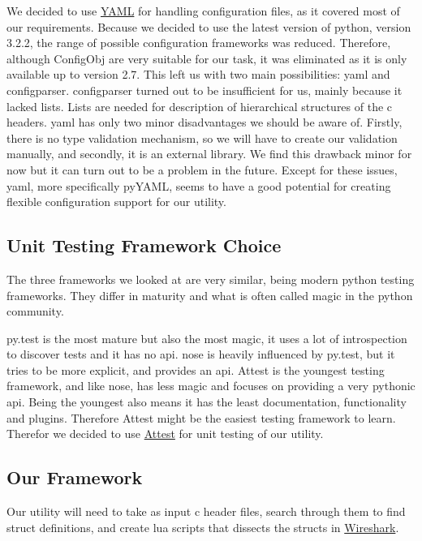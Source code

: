 We decided to use \hyperref[sec:pre:yaml]{YAML} for handling configuration
files, as it covered most of our requirements. Because we decided to use the
latest version of \Gls{python}, version 3.2.2, the range of possible configuration
frameworks was reduced. Therefore, although ConfigObj are very
suitable for our task, it was eliminated as it is only available
up to version 2.7. This left us with two main possibilities: \Gls{yaml} and
configparser. configparser turned out to be insufficient for us, mainly because
it lacked lists. Lists are needed for description of hierarchical structures of
the \Gls{c} \glspl{header}. \Gls{yaml} has only two minor disadvantages we should be aware of.
Firstly, there is no type validation mechanism, so we will have to create our
validation manually, and secondly, it is an external \gls{library}. We find this drawback
minor for now but it can turn out to be a problem in the future. Except for
these issues, \Gls{yaml}, more specifically pyYAML, seems to have a good potential
for creating flexible configuration support for our \gls{utility}.

\subsection{Unit Testing Framework Choice}
\label{sec:pre:testchoice}
The three frameworks we looked at  are very similar, being modern \Gls{python}
testing frameworks. They differ in maturity and what is often called magic in
the \Gls{python} community.

py.test is the most mature but also the most magic, it uses a lot of
introspection to discover tests and it has no \Gls{api}. nose is heavily influenced
by py.test, but it tries to be more explicit, and provides an \Gls{api}. Attest is
the youngest testing framework, and like nose, has less magic and focuses on
providing a very pythonic \Gls{api}. Being the youngest also means it has the least
documentation, functionality and plugins. Therefore Attest might be the easiest
testing framework to learn. Therefor we decided to use
\hyperref[sec:pre:attest]{Attest} for unit testing of our \gls{utility}.

\subsection{Our Framework}
\label{sec:pre:framework}
Our \gls{utility} will need to take as input \Gls{c} \gls{header} files, search through them to
find \gls{struct} definitions, and create \Gls{lua} scripts that dissects the \glspl{struct} in
\hyperref[sec:pre:wireshark]{Wireshark}.

